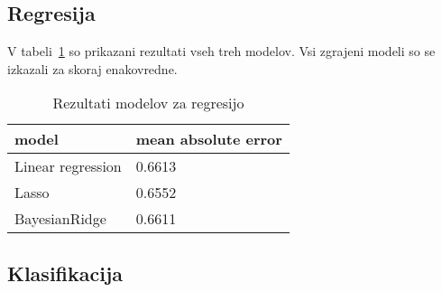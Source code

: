 \documentclass[a4paper,11pt]{article}
\begin{document}


\subsection{Regresija}
V tabeli~\ref{tab1} so prikazani rezultati vseh treh modelov. Vsi 
zgrajeni modeli so se izkazali za skoraj enakovredne.


\begin{table}[htbp]
\caption{Rezultati modelov za regresijo}
\label{tab1}
\begin{center}
\begin{tabular}{lp{4cm}}
\hline
model & mean absolute error \\
\hline
Linear regression & 0.6613 \\
Lasso & 0.6552 \\
BayesianRidge & 0.6611 \\
\hline
\end{tabular}
\end{center}
\end{table}

\subsection{Klasifikacija}
\end{document}
